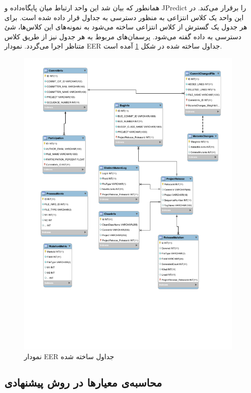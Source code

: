 همانطور که بیان شد این واحد ارتباط میان پایگاه‌داده و JPredict را برقرار می‌کند. در این واحد یک کلاس انتزاعی به منظور دسترسی به جداول قرار داده شده است.  برای هر جدول یک گسترش از کلاس انتزاعی ساخته می‌شود  به نمونه‌های این کلاس‌ها، شئ دسترسی به داده  گفته می‌شود. پرسمان‌های مربوط به هر جدول  نیز از طریق کلاس متناظر اجرا می‌گردد. نمودار EER جداول ساخته شده در شکل \ref{fig:EER} آمده است.
\begin{figure}[H]
	\centering
	\includegraphics[trim={0 5cm 0 0},width=1\textwidth]{img/method/EER.pdf}
	\caption{ نمودار EER جداول ساخته شده}
	\label{fig:EER}
\end{figure}

\subsection{محاسبه‌ی معیارها در روش پیشنهادی}

